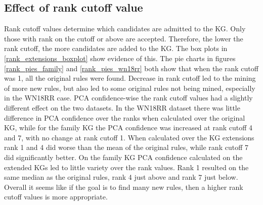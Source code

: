 \newpage
\subsection{Effect of rank cutoff value}
Rank cutoff values determine which candidates are admitted to the KG. Only those with rank on the cutoff or above are accepted. Therefore, the lower the rank cutoff, the more candidates are added to the KG. The box plots in \cref{rank_extensions_boxplot} show evidence of this. The pie charts in figures \ref{rank_pies_family} and \ref{rank_pies_wn18rr} both show that when the rank cutoff was 1, all the original rules were found. Decrease in rank cutoff led to the mining of more new rules, but  also led to some original rules not being mined, especially in the WN18RR case. PCA confidence-wise the rank cutoff values had a slightly different effect on the two datasets. In the WN18RR dataset there was little difference in PCA confidence over the ranks when calculated over the original KG, while for the family KG the PCA confidence was increased at rank cutoff 4 and 7, with no change at rank cutoff 1. When calculated over the KG extensions rank 1 and 4 did worse than the mean of the original rules, while rank cutoff 7 did significantly better. On the family KG PCA confidence calculated on the extended KGs led to little variety over the rank values. Rank 1 resulted on the same median as the original rules, rank 4 just above and rank 7 just below. Overall it seems like if the goal is to find many new rules, then a higher rank cutoff values is more appropriate.

